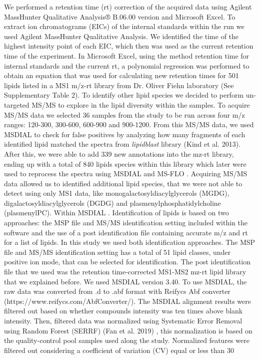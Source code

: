 \documentclass[9pt,twocolumn,twoside,lineno]{gsajnl}
\begin{document}
We performed a retention time (rt) correction of the acquired data using Agilent MassHunter Qualitative Analysis® B.06.00 version and Microsoft Excel. 
To extract ion chromatograms (EICs) of the internal standards within the run we used Agilent MassHunter Qualitative Analysis.
We identified the time of the highest intensity point of each EIC, which then was used as the current retention time of the experiment. 
In Microsoft Excel, using the method retention time for internal standards and the current rt, a polynomial regression was performed to obtain an equation that was used for calculating new retention times for 501 lipids listed in a MS1 m/z-rt library from Dr. Oliver Fiehn laboratory (See Supplementary Table 2). 
To identify other lipid species we decided to perform un-targeted MS/MS to explore in the lipid diversity within the samples. 
To acquire MS/MS data we selected 36 samples from the study to be run across four m/z ranges: 120-300, 300-600, 600-900 and 900-1200. 
From this MS/MS data, we used MSDIAL \cite{Tsugawa2015-kh} to check for false positives by analyzing how many fragments of each identified lipid matched the spectra from \textit{lipidblast} library (Kind et al. 2013). 
After this, we were able to add 339 new annotations into the mz-rt library, ending up with a total of 840 lipids species within this library which later were used to reprocess the spectra using MSDIAL and MS-FLO \cite{DeFelice}. 
Acquiring MS/MS data allowed us to identified additional lipid species, that we were not able to detect using only MS1 data, like monogalactosyldiacylglycerols (MGDG), digalactosyldiacylglycerols (DGDG) and plasmenylphosphatidylcholine (plasmenylPC). 
Within MSDIAL \cite{Tsugawa2015-kh}. Identification of lipids is based on two approaches: the MSP file and MS/MS identification setting included within the software and the use of a post identification file containing accurate m/z and rt for a list of lipids. In this study we used both identification approaches. 
The MSP file and MS/MS identification setting has a total of 51 lipid classes, under positive ion mode, that can be selected for identification. 
The post identification file that we used was the retention time-corrected MS1-MS2 mz-rt lipid library that we explained before. 
We used MSDIAL \cite{Tsugawa2015-kh} version 3.40. To use MSDIAL, the raw data was converted from .d to .abf format with Reifycs Abf converter (https://www.reifycs.com/AbfConverter/). The MSDIAL alignment results were filtered out based on whether compounds intensity was ten times above blank intensity. Then, filtered data was normalized using Systematic Error Removal using Random Forest (SERRF) \cite{Fan}(Fan et al. 2019) , this normalization is based on the quality-control pool samples used along the study. Normalized features were filtered out considering a coefficient of variation (CV) equal or less than 30%
\end{document}
